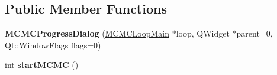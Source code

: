 \subsection*{Public Member Functions}
\begin{DoxyCompactItemize}
\item 
\hypertarget{class_m_c_m_c_progress_dialog_a088415e8cbadac71432efba7cb8e4606}{{\bfseries M\-C\-M\-C\-Progress\-Dialog} (\hyperlink{class_m_c_m_c_loop_main}{M\-C\-M\-C\-Loop\-Main} $\ast$loop, Q\-Widget $\ast$parent=0, Qt\-::\-Window\-Flags flags=0)}\label{class_m_c_m_c_progress_dialog_a088415e8cbadac71432efba7cb8e4606}

\item 
\hypertarget{class_m_c_m_c_progress_dialog_a5b81f4c32674310544fc833009d40cdc}{int {\bfseries start\-M\-C\-M\-C} ()}\label{class_m_c_m_c_progress_dialog_a5b81f4c32674310544fc833009d40cdc}

\end{DoxyCompactItemize}
